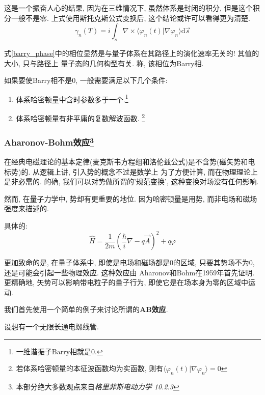 \documentclass[a4paper, 11pt]{article}
\begin{document}
\begin{spacing}{1.2}
        这是一个振奋人心的结果, 因为在三维情况下, 虽然体系是封闭的积分, 但是这个积分一般不是零. 
        上式使用斯托克斯公式变换后, 这个结论或许可以看得更为清楚.    
        \begin{equation}
          \gamma_n(T) = i\int_s\nabla\times\langle\varphi_n(t)|\nabla\varphi_n\rangle\mathrm{d}\vec{s}
        \end{equation}
        
        式\eqref{barry_phase}中的相位显然是与量子体系在其路径上的演化速率无关的! 其值的大小, 只与路径上
        量子态的几何构型有关. 称, 该相位为Barry相.

       如果要使Barry相不是0, 一般需要满足以下几个条件:
        \begin{enumerate}[1.]
          \item 体系哈密顿量中含时参数多于一个.\footnote{一维谐振子Barry相就是0.}
          \item 体系哈密顿量有非平庸的复数解波函数.
          \footnote{若体系哈密顿量的本征波函数均为实函数, 
          则有$\langle\varphi_n(t)|\nabla\varphi_n\rangle = 0$}
        \end{enumerate}

      \subsubsection{Aharonov-Bohm效应\protect\footnote{本部分绝大多数观点来自\emph{格里菲斯电动力学 10.2.3}}}
        在经典电磁理论的基本定律(麦克斯韦方程组和洛伦兹公式)是不含势(磁矢势和电标势)的. 从逻辑上讲, 引入势的概念不过是数学上
        为了方便计算, 而在物理理论上是非必需的. 的确, 我们可以对势做所谓的'规范变换', 这种变换对场没有任何影响.

        然而, 在量子力学中, 势却有更重要的地位. 因为哈密顿量是用势, 而非电场和磁场强度来描述的.

        具体的:
        \begin{equation}
          \hat{H} = \dfrac{1}{2m}\left(\dfrac{\hbar}{i}\nabla-q\vec{A}\right)^2 + q\varphi
        \end{equation}
        
        更加致命的是, 在量子体系中, 即使是电场和磁场都是0的区域, 只要其势场不为0, 还是可能会引起一些物理效应. 这种效应由
        Aharonov和Bohm在1959年首先证明. 更精确地, 矢势可以影响带电粒子的量子行为, 即使它是在场本身为零的区域中运动.

        我们首先使用一个简单的例子来讨论所谓的\textbf{AB效应}.

        设想有一个无限长通电螺线管.


\end{spacing}
\end{document}
